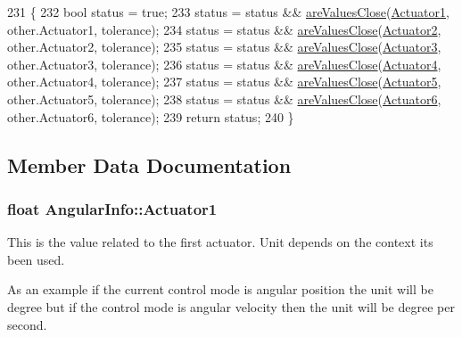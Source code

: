 \begin{DoxyCode}
231 \{
232     \textcolor{keywordtype}{bool} status = \textcolor{keyword}{true};
233     status = status && \hyperlink{namespacejaco_a09e679eeb93252a2cf092b064e724125}{areValuesClose}(\hyperlink{structAngularInfo_a5fc555c085bddc82c33a3039fbc40932}{Actuator1}, other.Actuator1, tolerance);
234     status = status && \hyperlink{namespacejaco_a09e679eeb93252a2cf092b064e724125}{areValuesClose}(\hyperlink{structAngularInfo_ab7b9349eef239f9741d9c28a795e4c35}{Actuator2}, other.Actuator2, tolerance);
235     status = status && \hyperlink{namespacejaco_a09e679eeb93252a2cf092b064e724125}{areValuesClose}(\hyperlink{structAngularInfo_a30426eab94c82cfd3d697bbc8c506c2a}{Actuator3}, other.Actuator3, tolerance);
236     status = status && \hyperlink{namespacejaco_a09e679eeb93252a2cf092b064e724125}{areValuesClose}(\hyperlink{structAngularInfo_a46a1314c4846de6a495310b44fe5e0c3}{Actuator4}, other.Actuator4, tolerance);
237     status = status && \hyperlink{namespacejaco_a09e679eeb93252a2cf092b064e724125}{areValuesClose}(\hyperlink{structAngularInfo_a953c29d2481eb1c42c84e9c992d34dde}{Actuator5}, other.Actuator5, tolerance);
238     status = status && \hyperlink{namespacejaco_a09e679eeb93252a2cf092b064e724125}{areValuesClose}(\hyperlink{structAngularInfo_ab54771129d8a9e451c27942dd349340d}{Actuator6}, other.Actuator6, tolerance);
239     \textcolor{keywordflow}{return} status;
240 \}
\end{DoxyCode}


\subsection{Member Data Documentation}
\subsubsection[{\texorpdfstring{Actuator1}{Actuator1}}]{\setlength{\rightskip}{0pt plus 5cm}float Angular\+Info\+::\+Actuator1\hspace{0.3cm}{\ttfamily [inherited]}}\hypertarget{structAngularInfo_a5fc555c085bddc82c33a3039fbc40932}{}\label{structAngularInfo_a5fc555c085bddc82c33a3039fbc40932}


This is the value related to the first actuator. Unit depends on the context it\textquotesingle{}s been used. 

As an example if the current control mode is angular position the unit will be degree but if the control mode is angular velocity then the unit will be degree per second. 
